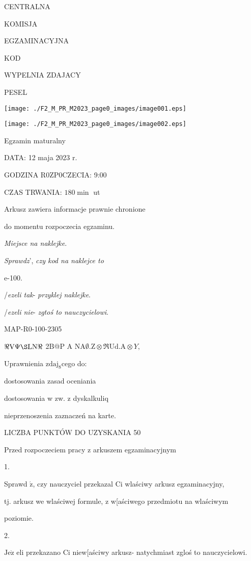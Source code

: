 \documentclass[a4paper,12pt]{article}
\begin{document}
CENTRALNA

KOMISJA

EGZAMINACYJNA

KOD

WYPELNIA ZDAJACY

PESEL
\begin{center}
\texttt{[image: ./F2\_M\_PR\_M2023\_page0\_images/image001.eps]}

\texttt{[image: ./F2\_M\_PR\_M2023\_page0\_images/image002.eps]}
\end{center}
Egzamin maturalny

DATA: 12 maja 2023 r.

GODZINA R0ZP0CZECIA: 9:00

CZAS TRWANIA: $180 \displaystyle \min$ ut

Arkusz zawiera informacje prawnie chronione

do momentu rozpoczecia egzaminu.

{\it Miejsce na naklejke}.

{\it Sprawdz}', {\it czy kod na naklejce to}

e-100.

/{\it ezeli tak}- {\it przyklej naklejke}.

/{\it ezeli nie}- {\it zgtoś to nauczycielowi}.

MAP-R0-100-2305

$\Re \mathrm{V}\Psi\S \mathrm{L}\mathrm{N}\Re$ 2B@P A $\mathrm{N}\mathrm{A}\emptyset.\mathrm{Z}\otimes\Re \mathrm{U}\mathrm{d}.\mathrm{A}\otimes Y,$

Uprawnienia $\mathrm{z}\mathrm{d}\mathrm{a}\mathrm{j}_{8}$cego do:

\fbox{} dostosowania zasad oceniania

\fbox{} dostosowania w zw. z dyskalkuliq

\fbox{} nieprzenoszenia zaznaczeń na karte.

LICZBA PUNKTÓW DO UZYSKANIA 50

Przed rozpoczeciem pracy z arkuszem egzaminacyjnym

1.

Sprawd $\acute{\mathrm{z}}$, czy nauczyciel przekazal Ci wlaściwy arkusz egzaminacyjny,

tj. arkusz we wlaściwej formule, z w[aściwego przedmiotu na wlaściwym

poziomie.

2.

$\mathrm{J}\mathrm{e}\dot{\mathrm{z}}$ eli przekazano Ci niew[aściwy arkusz- natychmiast zgloś to nauczycielowi.
\end{document}
